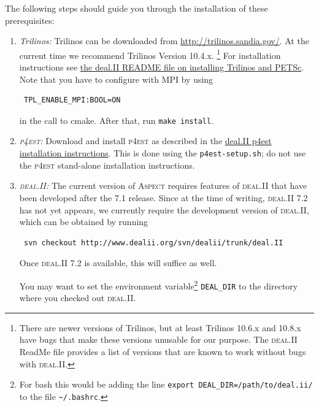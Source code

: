 \documentclass{article}
\newcommand{\dealii}{{\textsc{deal.II}}}
\newcommand{\pfrst}{{\normalfont\textsc{p4est}}}
\newcommand{\aspect}{\textsc{Aspect}}
\begin{document}
The following steps should guide you through the installation of these
prerequisites:
\begin{enumerate}
\item \textit{Trilinos:} Trilinos can be downloaded from
  \href{http://trilinos.sandia.gov/download/trilinos-10.4.html}{http://trilinos.sandia.gov/}. At
  the current time we recommend Trilinos Version 10.4.x.%
  \footnote{There are newer versions of Trilinos, but at least Trilinos 10.6.x
  and 10.8.x have bugs that make these versions unusable for our purpose. The
  \dealii{} ReadMe file provides a list of versions that are known to work
  without bugs with \dealii{}.} For installation instructions see
  \href{http://www.dealii.org/developer/readme-petsc-trilinos.html}{the deal.II README file on installing Trilinos and PETSc}. Note that you have
  to configure with MPI by using
\begin{verbatim}
 TPL_ENABLE_MPI:BOOL=ON
\end{verbatim}
  in the call to cmake. After that, run {\tt{make install}}.

\item \textit{\pfrst{}:} Download and install \pfrst{} as described in the
  \href{http://www.dealii.org/developer/external-libs/p4est.html}{deal.II
    p4est installation instructions}. This is done using the
  {\tt{p4est-setup.sh}}; do not use the \pfrst{} stand-alone installation
  instructions.

\item  \textit{\dealii{}:}
  The current version of \aspect{} requires features of \dealii{} that have
  been developed after the 7.1 release. Since at the time of writing,
  \dealii{} 7.2 has not yet appears, we currently require the development
  version of \dealii{}, which can be obtained by running
\begin{verbatim}
 svn checkout http://www.dealii.org/svn/dealii/trunk/deal.II
\end{verbatim}
  Once \dealii{} 7.2 is available, this will suffice as well.

  You may want to set the environment variable\footnote{For bash
    this would be adding the line {\tt{export DEAL\_DIR=/path/to/deal.ii/}} to
    the file {\tt{\~{}/.bashrc}}.}
{\tt{DEAL\_DIR}} to the directory where you checked out \dealii.


\end{enumerate}
\end{document}
